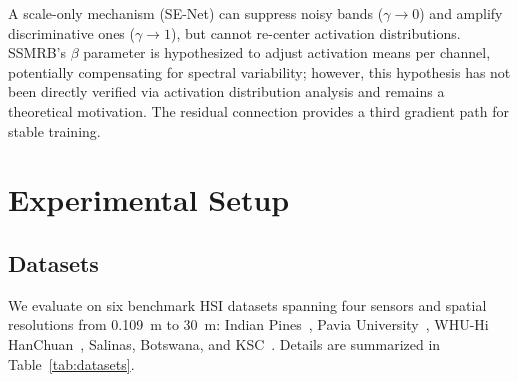 \documentclass[conference]{IEEEtran}
\begin{document}
\begin{table}[!t]
\caption{Comparison with Prior Modulation Mechanisms}
\label{tab:modulation_comparison}
\centering
{}
\end{table}

A scale-only mechanism (SE-Net) can suppress noisy bands ($\gamma \to 0$) and amplify discriminative ones ($\gamma \to 1$), but cannot re-center activation distributions. SSMRB's $\beta$ parameter is hypothesized to adjust activation means per channel, potentially compensating for spectral variability; however, this hypothesis has not been directly verified via activation distribution analysis and remains a theoretical motivation. The residual connection provides a third gradient path for stable training.

\section{Experimental Setup}

\subsection{Datasets}

We evaluate on six benchmark HSI datasets spanning four sensors and spatial resolutions from 0.109~m to 30~m: Indian Pines~\cite{baumgardner2015indian}, Pavia University~\cite{gamba2004pavia}, WHU-Hi HanChuan~\cite{zhong2020whu}, Salinas, Botswana, and KSC~\cite{gic2020hyperspectral}. Details are summarized in Table~\ref{tab:datasets}.
\end{document}
